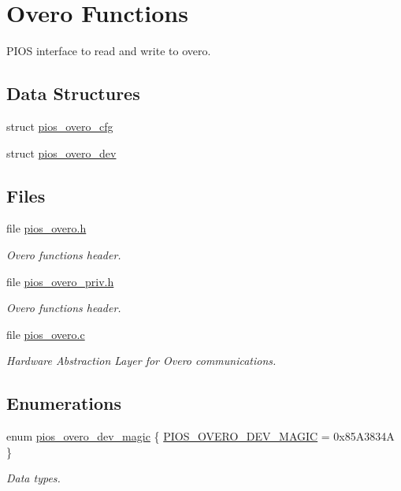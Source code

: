 \hypertarget{group___p_i_o_s___o_v_e_r_o}{\section{\-Overo \-Functions}
\label{group___p_i_o_s___o_v_e_r_o}
}


\-P\-I\-O\-S interface to read and write to overo.  


\subsection*{\-Data \-Structures}
\begin{DoxyCompactItemize}
\item 
struct \hyperlink{structpios__overo__cfg}{pios\-\_\-overo\-\_\-cfg}
\item 
struct \hyperlink{structpios__overo__dev}{pios\-\_\-overo\-\_\-dev}
\end{DoxyCompactItemize}
\subsection*{\-Files}
\begin{DoxyCompactItemize}
\item 
file \hyperlink{pios__overo_8h}{pios\-\_\-overo.\-h}
\begin{DoxyCompactList}\small\item\em \-Overo functions header. \end{DoxyCompactList}\item 
file \hyperlink{pios__overo__priv_8h}{pios\-\_\-overo\-\_\-priv.\-h}
\begin{DoxyCompactList}\small\item\em \-Overo functions header. \end{DoxyCompactList}\item 
file \hyperlink{pios__overo_8c}{pios\-\_\-overo.\-c}
\begin{DoxyCompactList}\small\item\em \-Hardware \-Abstraction \-Layer for \-Overo communications. \end{DoxyCompactList}\end{DoxyCompactItemize}
\subsection*{\-Enumerations}
\begin{DoxyCompactItemize}
\item 
enum \hyperlink{group___p_i_o_s___o_v_e_r_o_ga9b9fb7573bead7d69299823fb7f7a372}{pios\-\_\-overo\-\_\-dev\-\_\-magic} \{ \hyperlink{group___p_i_o_s___o_v_e_r_o_gga9b9fb7573bead7d69299823fb7f7a372a4b3b30ca1a20eb319f55d522e4eb1789}{\-P\-I\-O\-S\-\_\-\-O\-V\-E\-R\-O\-\_\-\-D\-E\-V\-\_\-\-M\-A\-G\-I\-C} =  0x85\-A3834\-A
 \}
\begin{DoxyCompactList}\small\item\em \-Data types. \end{DoxyCompactList}\end{DoxyCompactItemize}
